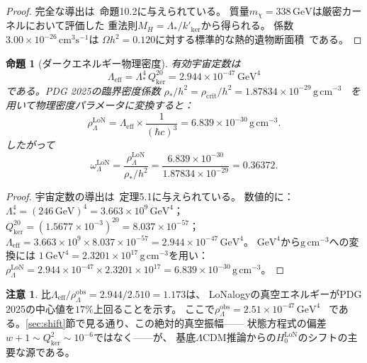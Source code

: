 \documentclass[12pt]{article}
\theoremstyle{plain}
\newtheorem{proposition}[theorem]{命題}
\theoremstyle{definition}
\newtheorem{remark}[theorem]{注意}
\numberwithin{equation}{section}
\newcommand{\kker}{\mathrm{ker}}
\newcommand{\eff}{\mathrm{eff}}
\newcommand{\obs}{\mathrm{obs}}
\newcommand{\LoN}{\mathrm{LoN}}
\newcommand{\crit}{\mathrm{crit}}
\begin{document}
\begin{proof}
完全な導出は~\cite{ParticleCosmo}命題10.2に与えられている。
質量$m_\chi=338\,\mathrm{GeV}$は厳密カーネルにおいて評価した
重法則$M_H=\Lambda_*/k'_{\kker}$から得られる。
係数$3.00\times10^{-26}\,\mathrm{cm}^3\mathrm{s}^{-1}$は
$\Omega h^2=0.120$に対する標準的な熱的遺物断面積~\cite{PDG2025}である。
\end{proof}

\begin{proposition}[ダークエネルギー物理密度]\label{prop:omegalambda}
有効宇宙定数は~\cite{ParticleCosmo}
\begin{equation}
\Lambda_{\eff} = \Lambda_*^4\,Q_{\kker}^{20} = 2.944\times10^{-47}\,\mathrm{GeV}^4
\end{equation}
である。PDG 2025の臨界密度係数
$\rho_*/h^2=\rho_{\crit}/h^2=1.87834\times10^{-29}\,\mathrm{g\,cm^{-3}}$~\cite{PDG2025}
を用いて物理密度パラメータに変換すると：
\begin{equation}
\rho_\Lambda^{\LoN}
= \Lambda_{\eff}\times\frac{1}{(\hbar c)^3}
= 6.839\times10^{-30}\,\mathrm{g\,cm^{-3}}.
\end{equation}
したがって
\begin{equation}\label{eq:omegalambda}
\boxed{\omega_\Lambda^{\LoN}
= \frac{\rho_\Lambda^{\LoN}}{\rho_*/h^2}
= \frac{6.839\times10^{-30}}{1.87834\times10^{-29}}
= 0.36372.}
\end{equation}
\end{proposition}

\begin{proof}
宇宙定数の導出は~\cite{ParticleCosmo}定理5.1に与えられている。
数値的に：$\Lambda_*^4=(246\,\mathrm{GeV})^4=3.663\times10^9\,\mathrm{GeV}^4$；
$Q_{\kker}^{20}=(1.5677\times10^{-3})^{20}=8.037\times10^{-57}$；
$\Lambda_{\eff}=3.663\times10^9\times8.037\times10^{-57}=2.944\times10^{-47}\,\mathrm{GeV}^4$。
$\mathrm{GeV}^4$から$\mathrm{g\,cm^{-3}}$への変換には
$1\,\mathrm{GeV}^4=2.3201\times10^{17}\,\mathrm{g\,cm^{-3}}$を用い：
$\rho_\Lambda^{\LoN}=2.944\times10^{-47}\times2.3201\times10^{17}=6.839\times10^{-30}\,\mathrm{g\,cm^{-3}}$。
\end{proof}

\begin{remark}
比$\Lambda_{\eff}/\rho_\Lambda^{\obs}=2.944/2.510=1.173$は、
LoNalogyの真空エネルギーがPDG 2025の中心値を$17\%$上回ることを示す。
ここで$\rho_\Lambda^{\obs}=2.51\times10^{-47}\,\mathrm{GeV}^4$~\cite{PDG2025}
である。\ref{sec:shift}節で見る通り、この絶対的真空振幅——
状態方程式の偏差$w+1\sim Q_{\kker}^2\sim10^{-6}$ではなく——が、
基底$\Lambda$CDM推論からの$H_0^{\LoN}$のシフトの主要な源である。
\end{remark}
\end{document}
